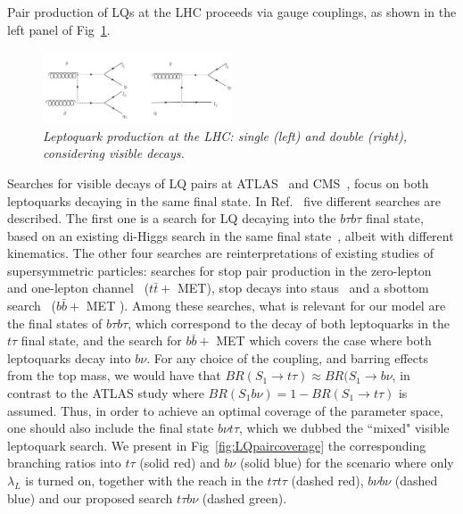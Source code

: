 \documentclass[11pt]{cernrep}
\begin{document}
Pair production of LQs at the LHC proceeds via gauge couplings, as shown in the left panel of Fig~\ref{fig:LQvisible}.

 \begin{figure}[!htp]
  \centering
  \includegraphics[width=0.5\textwidth]{./figures/LQ_visible.png} 
  \caption{\it Leptoquark production at the LHC: single (left) and double (right), considering visible decays.}
\label{fig:LQvisible}
\end{figure}
Searches for visible decays of LQ pairs at ATLAS~\cite{Aad:2015caa,Aaboud:2019jcc,Aaboud:2019bye} and CMS~\cite{Sirunyan:2018nkj,Sirunyan:2018kzh,Sirunyan:2018vhk}, focus on both leptoquarks decaying in the same final state. In Ref.~\cite{Aaboud:2019bye} five different searches are described. The first one is a search for LQ decaying into the $b \tau b \tau$ final state, based on an existing di-Higgs search in the same final state~\cite{Aaboud:2018sfw}, albeit with different kinematics. The other four searches are reinterpretations of existing studies of supersymmetric particles: searches for stop pair production in the zero-lepton~\cite{Aaboud:2017ayj} and one-lepton channel~\cite{Aaboud:2017aeu} ($t \bar{t} +$ MET), stop decays into staus~\cite{Aaboud:2018kya} and a sbottom search~\cite{Aaboud:2017wqg} ($b\bar{b} + $ MET ). Among these searches, what is relevant for our model are the final states of $b \tau b \tau$, which correspond to the decay of both leptoquarks in the $t \tau$ final state, and the search for $b \bar{b} +$ MET  which covers the case where both leptoquarks decay into $b \nu$. For any choice of the coupling, and barring effects from the top mass, we would have that $BR (S_1 \to t \tau) \approx BR (S_1 \to b \nu$, in contrast to the ATLAS study where $BR(S_1 b \nu) = 1 - BR(S_1 \to t \tau)$ is assumed. Thus, in order to achieve an optimal coverage of the parameter space, one should also include the final state $b \nu t \tau$, which we dubbed the ``mixed" visible leptoquark search. We present in Fig~\ref{fig:LQpaircoverage} the corresponding branching ratios into $t \tau$ (solid red) and $b \nu$ (solid blue) for the scenario where only $\lambda_L$ is turned on, together with the reach in the $t \tau t \tau$ (dashed red), $b \nu b \nu$ (dashed blue) and our proposed search $t \tau b \nu$ (dashed green).
\end{document}
